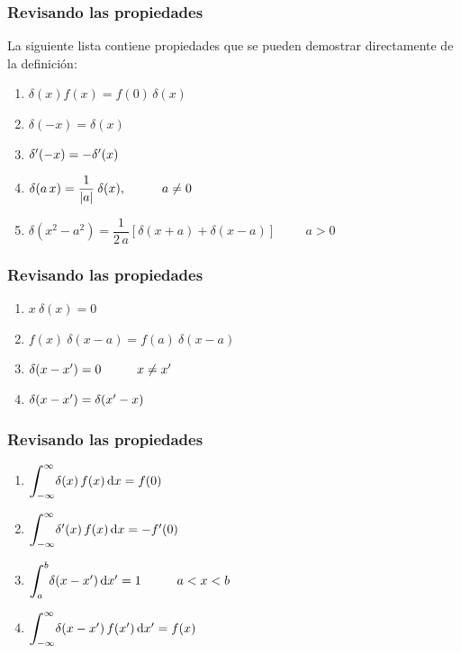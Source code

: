\documentclass[12pt]{beamer}
\begin{document}
\begin{frame}
\frametitle{Revisando las propiedades}
La siguiente lista contiene propiedades que se pueden demostrar directamente de la definición:
\pause
{}
\begin{enumerate}[<+->]
\item $\delta (x) f (x) = f (0) \, \delta (x)$
\item $\delta (-x) = \delta (x)$
\item ${\delta}^{\prime} (- x) = - {\delta}^{\prime} (x)$
\item $\delta(a \, x) = \dfrac{1}{\abs{a}} \: \delta (x), \hspace{1cm} a \neq 0$
\item $\delta (x^{2} - a^{2}) = \dfrac{1}{2 \, a} \left[ \delta (x + a) + \delta (x - a) \right] \hspace{1cm} a > 0$
\seti
\end{enumerate}
\end{frame}

\begin{frame}
\frametitle{Revisando las propiedades}
\begin{enumerate}[<+->]
\conti
\item $x \: \delta(x) = 0$
\item $f (x) \: \delta(x - a) = f(a) \: \delta(x - a)$
\item $\delta (x - {x}^{\prime}) = 0 \hspace{1cm} x \neq {x}^{\prime}$
\item $\delta (x - {x}^{\prime}) = \delta ({x}^{\prime} - x)$
\seti
\end{enumerate}
\end{frame}

\begin{frame}
\frametitle{Revisando las propiedades}
\begin{enumerate}[<+->]
\conti
\item $\scaleint{6ex}_{\bs -\infty}^{\infty} \delta (x) \, f (x) \dd{x} = f (0)$
\item $\scaleint{6ex}_{\bs -\infty}^{\infty} \pderivada{\delta} (x) \, f (x) \dd{x} = - \pderivada{f} (0)$
\item $\scaleint{6ex}_{\bs a}^{b} \delta (x - \pderivada{x}) \dd{\pderivada{x}} = 1 \hspace{1cm} a < x < b$
\item $\scaleint{6ex}_{\bs -\infty}^{\infty} \delta (x - \pderivada{x}) \, f (\pderivada{x}) \dd{\pderivada{x}} = f (x)$
\seti
\end{enumerate}
\end{frame}
\end{document}
